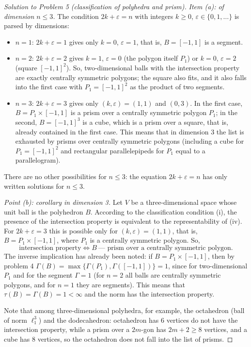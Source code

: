 \documentclass[a4paper,12pt]{report}
\begin{document}
\begin{proof}[Solution to Problem \textup{5} \textup{(}classification of polyhedra and prism\textup{)}]
\textit{Item \textup{(a)}\textup{:} of dimension $n\le3$.} The condition $2k+\varepsilon=n$ with integers $k\ge0$, $\varepsilon\in\{0,1,\dots\}$ is parsed by dimensions\textup{:}
\begin{itemize}
\item $n=1$\textup{:} $2k+\varepsilon=1$ gives only $k=0$, $\varepsilon=1$, that is, $B=[-1,1]$ is a segment.
\item $n=2$\textup{:} $2k+\varepsilon=2$ gives $k=1$, $\varepsilon=0$ \textup{(}the polygon itself $P_1$\textup{)} or $k=0$, $\varepsilon=2$ \textup{(}square $[-1,1]^2$\textup{)}. So, two-dimensional balls with the intersection property are exactly centrally symmetric polygons\textup{;} the square also fits, and it also falls into the first case with $P_1=[-1,1]^2$ as the product of two segments.
\item $n=3$\textup{:} $2k+\varepsilon=3$ gives only $(k,\varepsilon)=(1,1)$ and $(0,3)$. In the first case, $B=P_1\times[-1,1]$ is a prism over a centrally symmetric polygon $P_1$; in the second, $B=[-1,1]^3$ is a cube, which is a prism over a square, that is, already contained in the first case. This means that in dimension \textup{3} the list is exhausted by prisms over centrally symmetric polygons \textup{(}including a cube for $P_1=[-1,1]^2$ and rectangular parallelepipeds for $P_1$ equal to a parallelogram\textup{)}.
\end{itemize}
There are no other possibilities for $n\le3$\textup{:} the equation $2k+\varepsilon=n$ has only written solutions for $n\le3$.

\textit{Point \textup{(b)}\textup{:} corollary in dimension \textup{3}.} Let $V$ be a three-dimensional space whose unit ball is the polyhedron $B$. According to the classification condition \textup{(i)}, the presence of the intersection property is equivalent to the representability of \textup{(iv)}. For $2k+\varepsilon=3$ this is possible only for $(k,\varepsilon)=(1,1)$, that is, $B=P_1\times[-1,1]$, where $P_1$ is a centrally symmetric polygon. So,
\[
\text{intersection property}\iff B\ \text{--- prism over a centrally symmetric polygon}.
\]
The inverse implication has already been noted\textup{:} if $B=P_1\times[-1,1]$, then by problem \textup{4} $\Gamma(B)=\max\{\Gamma(P_1),\Gamma([-1,1])\}=1$, since for two-dimensional $P_1$ and for the segment $\Gamma=1$ \textup{(}for $n=2$ all balls are centrally symmetric polygons, and for $n=1$ they are segments\textup{)}. This means that $\tau(B)=\Gamma(B)=1<\infty$ and the norm has the intersection property.

Note that among three-dimensional polyhedra, for example, the octahedron \textup{(}ball of norm $\ell_1^3$\textup{)} and the dodecahedron\textup{:} octahedron has $6$ vertices do not have the intersection property, while a prism over a $2m$-gon has $2m+2\ge8$ vertices, and a cube has $8$ vertices, so the octahedron does not fall into the list of prisms.

\end{proof}
\end{document}
